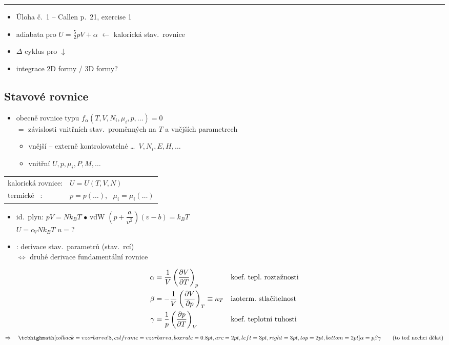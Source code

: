 \noindent\rule{\linewidth}{0.4pt}

\begin{itemize}[label=$\Rightarrow$]
  \item Úloha č.\ 1 -- Callen p.\ 21, exercise 1
  \item adiabata pro \quad $U = \frac52 pV + \alpha$ \quad $\leftarrow$ kalorická stav.\ rovnice
  \item $\Delta$ cyklus pro \quad $\downarrow$
  \item integrace 2D formy / 3D formy?
\end{itemize}

\subsection*{Stavové rovnice}
\begin{itemize}[nosep]
  \item[--] obecně rovnice typu \quad $f_\alpha(T, V, N_i, \mu_i, p, \dots) = 0$ \\
  $=$ závislosti vnitřních stav.\ proměnných na $T$ a vnějších parametrech
  \begin{itemize}[nosep]
    \item vnější -- externě kontrolovatelné \dots\ $V, N_i, E, H, \dots$
    \item vnitřní \hspace*{4.2cm} $U, p, \mu_i, P, M, \dots$ \\
  \end{itemize}
\end{itemize}
\begin{tabular}{@{}ll}
kalorická rovnice: & $U = U(T, V, N)$ \\
termické \quad\ : & $p = p(\dots)$, \ $\mu_i = \mu_i(\dots)$
\end{tabular}

\begin{itemize}
  \item id.\ plyn: \quad $pV = Nk_BT$ \hfill $\bullet$ vdW \quad $\left(p + \dfrac{a}{v^2}\right)(v - b) = k_BT$ \\
  \hspace*{1.6cm} $U = c_VNk_BT$ \hfill $u = ?$\hspace*{2.2cm}
  \item {}: derivace stav.\ parametrů (stav.\ rcí) \\
  \quad $\Leftrightarrow$ druhé derivace fundamentální rovnice
\end{itemize}
\begin{align*}
  \alpha &= \frac1V\left(\pdv{V}{T}\right)_p && \text{koef.\ tepl.\ roztažnosti} \\
  \beta &= -\frac1V\left(\pdv{V}{p}\right)_T \equiv \kappa_T && \text{izoterm.\ stlačitelnost} \\
  \gamma &= \frac1p\left(\pdv{p}{T}\right)_V && \text{koef.\ teplotní tuhosti}
\end{align*}
\[
  \Rightarrow\quad \vzorec{\alpha = p\beta\gamma} \qquad \text{(to teď nechci dělat)}
\]

